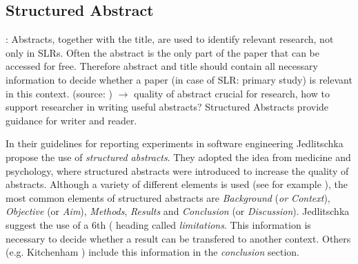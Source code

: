 \subsection{Structured Abstract}
\label{subsec:structured abstract}

: Abstracts, together with the title, are used to identify relevant research, not only in SLRs. Often the abstract is the only part of the paper that can be accessed for free. Therefore abstract and title should contain all necessary information to decide whether a paper (in case of SLR: primary study) is relevant in this context. (source: )
	$\rightarrow$ quality of abstract crucial for research, how to support researcher in writing useful abstracts? Structured Abstracts provide guidance for writer and reader. 
\newline

In their guidelines for reporting experiments in software engineering Jedlitschka \etal \cite{Jedlitschka2008} propose the use of \emph{structured abstracts}. They adopted the idea from medicine and psychology, where structured abstracts were introduced to increase the quality of abstracts. Although a variety of different elements is used (see for example ), the most common elements of structured abstracts are \emph{Background} (\emph{or Context}), \emph{Objective} (or \emph{Aim}), \emph{Methods}, \emph{Results} and \emph{Conclusion} (or \emph{Discussion}). Jedlitschka \etal \cite{Jedlitschka2008} suggest the use of a 6th ( heading called \emph{limitations}. This information is necessary to decide whether a result can be transfered to another context. Others  (e.g. Kitchenham \etal \cite{KBO2008}) include this information in the \emph{conclusion} section.

